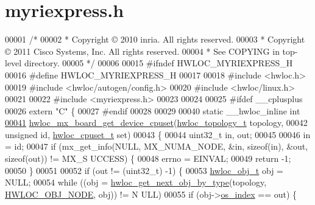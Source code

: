 \hypertarget{a00036_source}{
\section{myriexpress.h}
}

\begin{DoxyCode}
00001 \textcolor{comment}{/*}
00002 \textcolor{comment}{ * Copyright © 2010 inria.  All rights reserved.}
00003 \textcolor{comment}{ * Copyright © 2011 Cisco Systems, Inc.  All rights reserved.}
00004 \textcolor{comment}{ * See COPYING in top-level directory.}
00005 \textcolor{comment}{ */}
00006 
00015 \textcolor{preprocessor}{#ifndef HWLOC\_MYRIEXPRESS\_H}
00016 \textcolor{preprocessor}{}\textcolor{preprocessor}{#define HWLOC\_MYRIEXPRESS\_H}
00017 \textcolor{preprocessor}{}
00018 \textcolor{preprocessor}{#include <hwloc.h>}
00019 \textcolor{preprocessor}{#include <hwloc/autogen/config.h>}
00020 \textcolor{preprocessor}{#include <hwloc/linux.h>}
00021 
00022 \textcolor{preprocessor}{#include <myriexpress.h>}
00023 
00024 
00025 \textcolor{preprocessor}{#ifdef \_\_cplusplus}
00026 \textcolor{preprocessor}{}\textcolor{keyword}{extern} \textcolor{stringliteral}{"C"} \{
00027 \textcolor{preprocessor}{#endif}
00028 \textcolor{preprocessor}{}
00029 
00040 \textcolor{keyword}{static} \_\_hwloc\_inline \textcolor{keywordtype}{int}
\hypertarget{a00036_source_l00041}{}\hyperlink{a00074_ga87f4746d0cad579ce4e86b98088f22a1}{00041} \hyperlink{a00074_ga87f4746d0cad579ce4e86b98088f22a1}{hwloc_mx_board_get_device_cpuset}(\hyperlink{a00039_ga9d1e76ee15a7dee158b786c30b6a6e38}{hwloc_topology_t} topology,
00042                                  \textcolor{keywordtype}{unsigned} \textcolor{keywordtype}{id}, \hyperlink{a00040_ga4bbf39b68b6f568fb92739e7c0ea7801}{hwloc_cpuset_t} \textcolor{keyword}{set})
00043 \{
00044   uint32\_t in, out;
00045 
00046   in = id;
00047   \textcolor{keywordflow}{if} (mx\_get\_info(NULL, MX\_NUMA\_NODE, &in, \textcolor{keyword}{sizeof}(in), &out, \textcolor{keyword}{sizeof}(out)) != MX\_S
      UCCESS) \{
00048     errno = EINVAL;
00049     \textcolor{keywordflow}{return} -1;
00050   \}
00051 
00052   \textcolor{keywordflow}{if} (out != (uint32\_t) -1) \{
00053     \hyperlink{a00016}{hwloc_obj_t} obj = NULL;
00054     \textcolor{keywordflow}{while} ((obj = \hyperlink{a00053_ga5f08ceb69375341e73563cfe2e77534e}{hwloc_get_next_obj_by_type}(topology, \hyperlink{a00041_ggacd37bb612667dc437d66bfb175a8dc55aaf0964881117bdedf1a5e9332cd120dd}{HWLOC_OBJ_NODE}, obj)) != N
      ULL)
00055       \textcolor{keywordflow}{if} (obj->\hyperlink{a00016_a61a7a80a68eaccbaaa28269e678c81a9}{os_index} == out) \{

\end{DoxyCode}
